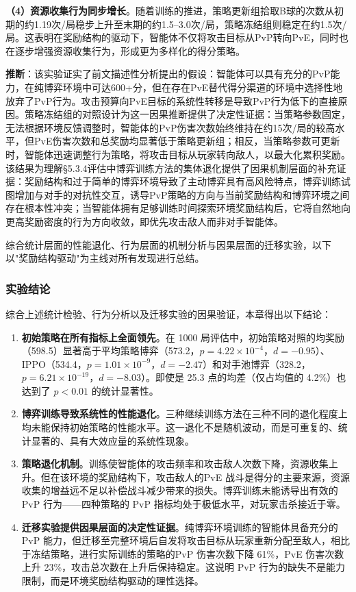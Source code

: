 \documentclass[12pt, a4paper, UTF8]{ctexart}
\numberwithin{equation}{section}
\begin{document}
\textbf{（4）资源收集行为同步增长}。随着训练的推进，策略更新组拾取B球的次数从初期的约1.19次/局稳步上升至末期的约1.5--3.0次/局，策略冻结组则稳定在约1.5次/局。这表明在奖励结构的驱动下，智能体不仅将攻击目标从PvP转向PvE，同时也在逐步增强资源收集行为，形成更为多样化的得分策略。

\textbf{推断}：该实验证实了前文描述性分析提出的假设：智能体可以具有充分的PvP能力，在纯博弈环境中可达600+分，但在存在PvE替代得分渠道的环境中选择性地放弃了PvP行为。攻击预算向PvE目标的系统性转移是导致PvP行为低下的直接原因。策略冻结组的对照设计为这一因果推断提供了决定性证据：当策略参数固定，无法根据环境反馈调整时，智能体的PvP伤害次数始终维持在约15次/局的较高水平，但PvE伤害次数和总奖励均显著低于策略更新组；相反，当策略参数可更新时，智能体迅速调整行为策略，将攻击目标从玩家转向敌人，以最大化累积奖励。该结果为理解\S5.3.4评估中博弈训练方法的集体退化提供了因果机制层面的补充证据：奖励结构和过于简单的博弈环境导致了主动博弈具有高风险特点，博弈训练试图增加与对手的对抗性交互，诱导PvP策略的方向与当前奖励结构和博弈环境之间存在根本性冲突；当智能体拥有足够训练时间探索环境奖励结构后，它将自然地向更高奖励密度的行为方向收敛，即优先攻击敌人而非对手智能体。

综合统计层面的性能退化、行为层面的机制分析与因果层面的迁移实验，以下以"奖励结构驱动"为主线对所有发现进行总结。

\subsubsection{实验结论}
综合上述统计检验、行为分析以及迁移实验的因果验证，本章得出以下结论：

\begin{enumerate}[label=(\arabic*)]
  \item \textbf{初始策略在所有指标上全面领先}。在 1000 局评估中，初始策略对照的均奖励（598.5）显著高于平均策略博弈（573.2，$p=4.22\times10^{-4}$，$d=-0.95$）、IPPO（534.4，$p=1.01\times10^{-9}$，$d=-2.47$）和对手池博弈（328.2，$p=6.21\times10^{-19}$，$d=-8.03$）。即使是 25.3 点的均差（仅占均值的 4.2\%）也达到了 $p<0.01$ 的统计显著性。
  \item \textbf{博弈训练导致系统性的性能退化}。三种继续训练方法在三种不同的退化程度上均未能保持初始策略的性能水平。这一退化不是随机波动，而是可重复的、统计显著的、具有大效应量的系统性现象。
  \item \textbf{策略退化机制}。训练使智能体的攻击频率和攻击敌人次数下降，资源收集上升。但在该环境的奖励结构下，攻击敌人的PvE 战斗是得分的主要来源，资源收集的增益远不足以补偿战斗减少带来的损失。博弈训练未能诱导出有效的 PvP 行为——四种策略的 PvP 指标均处于极低水平，对玩家击杀接近于零。
  \item \textbf{迁移实验提供因果层面的决定性证据}。纯博弈环境训练的智能体具备充分的 PvP 能力，但迁移至完整环境后自发将攻击目标从玩家重新分配至敌人，相比于冻结策略，进行实际训练的策略的PvP 伤害次数下降 61\%，PvE 伤害次数上升 23\%，攻击总次数在上升后保持稳定。这说明 PvP 行为的缺失不是能力限制，而是环境奖励结构驱动的理性选择。
\end{enumerate}
\end{document}
